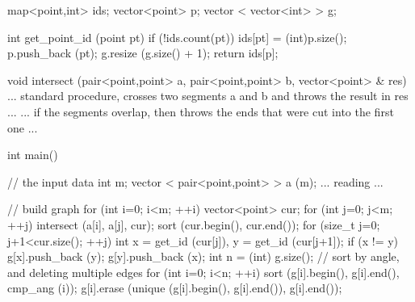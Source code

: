 map<point,int> ids;
vector<point> p;
vector < vector<int> > g;

int get_point_id (point pt) {
if (!ids.count(pt)) {
ids[pt] = (int)p.size();
p.push_back (pt);
g.resize (g.size() + 1);
}
return ids[p];
}

void intersect (pair<point,point> a, pair<point,point> b, vector<point> & res) {
... standard procedure, crosses two segments a and b and throws the result in res ...
... if the segments overlap, then throws the ends that were cut into the first one ...
}

int main() {
// the input data
int m;
vector < pair<point,point> > a (m);
... reading ...

// build graph
for (int i=0; i<m; ++i) {
vector<point> cur;
for (int j=0; j<m; ++j)
intersect (a[i], a[j], cur);
sort (cur.begin(), cur.end());
for (size_t j=0; j+1<cur.size(); ++j) {
int x = get_id (cur[j]), y = get_id (cur[j+1]);
if (x != y) {
g[x].push_back (y);
g[y].push_back (x);
}
}
}
int n = (int) g.size();
// sort by angle, and deleting multiple edges
for (int i=0; i<n; ++i) {
sort (g[i].begin(), g[i].end(), cmp_ang (i));
g[i].erase (unique (g[i].begin(), g[i].end()), g[i].end());
}
}
\endcode